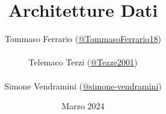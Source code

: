 \documentclass[a4paper,15pt, oneside]{book}
\title{Architetture Dati}
\author{Tommaso Ferrario (\href{https://github.com/TommasoFerrario18}{@TommasoFerrario18}) \\\\
Telemaco Terzi (\href{https://github.com/Tezze2001}{@Tezze2001}) \\\\
Simone Vendramini (\href{https://github.com/simone-vendramini}{@simone-vendramini})}
\date{Marzo 2024}
\begin{document}
\maketitle
\newtheorem{teorema}{Teorema}
\newtheorem{dimostrazione}{Dimostrazione}
\newtheorem{definizione}{Definizione}
\newtheorem{esempio}{Esempio}
\newtheorem{osservazione}{Osservazione}
\newtheorem{nota}{Nota}
\newtheorem{corollario}{Corollario}
\tableofcontents
\renewcommand{\chaptermark}[1]{
    \markboth{\chaptername
        \ \thechapter.\ #1}{}}
\renewcommand{\sectionmark}[1]{\markright{\thesection.\ #1}}







\end{document}
